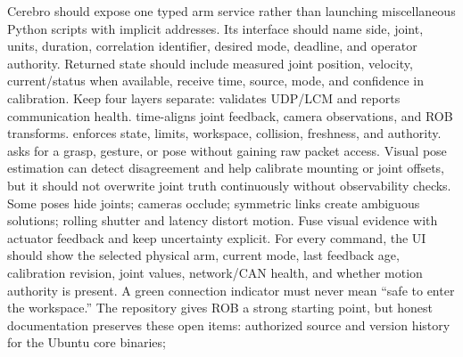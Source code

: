 {}
\markdownRendererSectionEnd \markdownRendererSectionBegin
{}\markdownRendererInterblockSeparator
{}Cerebro should expose one typed arm service rather than launching miscellaneous Python scripts with implicit addresses. Its interface should name side, joint, units, duration, correlation identifier, desired mode, deadline, and operator authority. Returned state should include measured joint position, velocity, current/status when available, receive time, source, mode, and confidence in calibration.\markdownRendererParagraphSeparator
{}Keep four layers separate:\markdownRendererInterblockSeparator
{}\markdownRendererOlBegin
{} validates UDP/LCM and reports communication health.\markdownRendererOlItemEnd 
{} time-aligns joint feedback, camera observations, and ROB transforms.\markdownRendererOlItemEnd 
{} enforces state, limits, workspace, collision, freshness, and authority.\markdownRendererOlItemEnd 
{} asks for a grasp, gesture, or pose without gaining raw packet access.\markdownRendererOlItemEnd 
\markdownRendererOlEnd \markdownRendererInterblockSeparator
{}Visual pose estimation can detect disagreement and help calibrate mounting or joint offsets, but it should not overwrite joint truth continuously without observability checks. Some poses hide joints; cameras occlude; symmetric links create ambiguous solutions; rolling shutter and latency distort motion. Fuse visual evidence with actuator feedback and keep uncertainty explicit.\markdownRendererParagraphSeparator
{}For every command, the UI should show the selected physical arm, current mode, last feedback age, calibration revision, joint values, network/CAN health, and whether motion authority is present. A green connection indicator must never mean “safe to enter the workspace.”\markdownRendererInterblockSeparator
{}
\markdownRendererSectionEnd \markdownRendererSectionBegin
{}\markdownRendererInterblockSeparator
{}The repository gives ROB a strong starting point, but honest documentation preserves these open items:\markdownRendererInterblockSeparator
{}\markdownRendererUlBegin
\markdownRendererUlItem authorized source and version history for the Ubuntu core binaries;\markdownRendererUlItemEnd 
